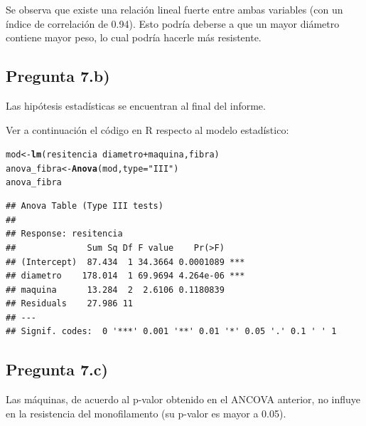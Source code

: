 \documentclass[10pt,a4paper]{article}\usepackage[]{graphicx}\usepackage[]{color}
\makeatletter
\newcommand{\hlstr}[1]{\textcolor[rgb]{0.192,0.494,0.8}{#1}}%
\newcommand{\hlopt}[1]{\textcolor[rgb]{0,0,0}{#1}}%
\newcommand{\hlstd}[1]{\textcolor[rgb]{0.345,0.345,0.345}{#1}}%
\newcommand{\hlkwb}[1]{\textcolor[rgb]{0.69,0.353,0.396}{#1}}%
\newcommand{\hlkwc}[1]{\textcolor[rgb]{0.333,0.667,0.333}{#1}}%
\newcommand{\hlkwd}[1]{\textcolor[rgb]{0.737,0.353,0.396}{\textbf{#1}}}%
\newenvironment{kframe}{%
 \def\at@end@of@kframe{}%
 \ifinner\ifhmode%
  \def\at@end@of@kframe{\end{minipage}}%
  \begin{minipage}{\columnwidth}%
 \fi\fi%
 \def\FrameCommand##1{\hskip\@totalleftmargin \hskip-\fboxsep
 \colorbox{shadecolor}{##1}\hskip-\fboxsep
     \hskip-\linewidth \hskip-\@totalleftmargin \hskip\columnwidth}%
 \MakeFramed {\advance\hsize-\width
   \@totalleftmargin\z@ \linewidth\hsize
   \@setminipage}}%
 {\par\unskip\endMakeFramed%
 \at@end@of@kframe}
\newenvironment{knitrout}{}{} %
\makeatother
\begin{document}
Se observa que existe una relación lineal fuerte entre ambas variables (con un índice de correlación de 0.94). Esto podría deberse a que un mayor diámetro contiene mayor peso, lo cual podría hacerle más resistente.

\subsection{Pregunta 7.b)}
Las hipótesis estadísticas se encuentran al final del informe.

Ver a continuación el código en R respecto al modelo estadístico:

\begin{knitrout}\small
{}\color{fgcolor}\begin{kframe}
\begin{alltt}
\hlstd{mod} \hlkwb{<-} \hlkwd{lm}\hlstd{(resitencia} \hlopt{~} \hlstd{diametro} \hlopt{+} \hlstd{maquina, fibra)}
\hlstd{anova_fibra} \hlkwb{<-} \hlkwd{Anova}\hlstd{(mod,} \hlkwc{type} \hlstd{=} \hlstr{"III"}\hlstd{)}
\hlstd{anova_fibra}
\end{alltt}
\begin{verbatim}
## Anova Table (Type III tests)
## 
## Response: resitencia
##              Sum Sq Df F value    Pr(>F)    
## (Intercept)  87.434  1 34.3664 0.0001089 ***
## diametro    178.014  1 69.9694 4.264e-06 ***
## maquina      13.284  2  2.6106 0.1180839    
## Residuals    27.986 11                      
## ---
## Signif. codes:  0 '***' 0.001 '**' 0.01 '*' 0.05 '.' 0.1 ' ' 1
\end{verbatim}
\end{kframe}
\end{knitrout}

\subsection{Pregunta 7.c)}
Las máquinas, de acuerdo al p-valor obtenido en el ANCOVA anterior, no influye en la resistencia del monofilamento (su p-valor es mayor a 0.05).
\end{document}

